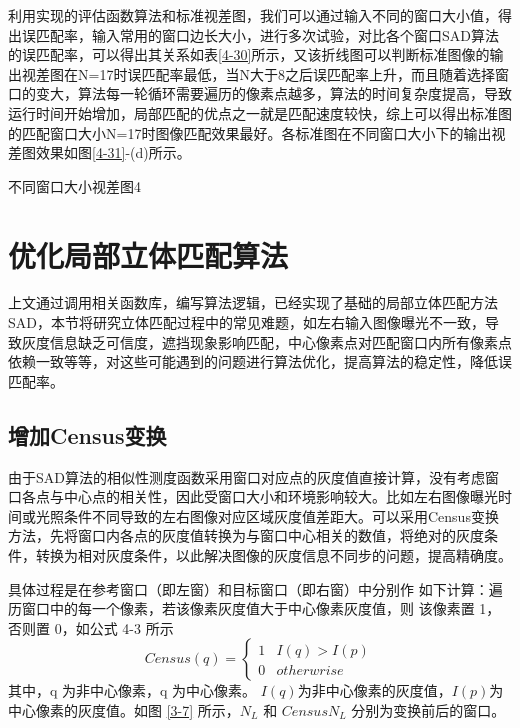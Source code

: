 利用实现的评估函数算法和标准视差图，我们可以通过输入不同的窗口大小值，得出误匹配率，输入常用的窗口边长大小，进行多次试验，对比各个窗口SAD算法的误匹配率，可以得出其关系如表\ref{4-30}所示，又该折线图可以判断标准图像的输出视差图在N=17时误匹配率最低，当N大于8之后误匹配率上升，而且随着选择窗口的变大，算法每一轮循环需要遍历的像素点越多，算法的时间复杂度提高，导致运行时间开始增加，局部匹配的优点之一就是匹配速度较快，综上可以得出标准图的匹配窗口大小N=17时图像匹配效果最好。各标准图在不同窗口大小下的输出视差图效果如图\ref{4-31}-(d)所示。

\begin{pics}[h]{不同窗口大小视差图}{4}
\end{pics}

\section{优化局部立体匹配算法}

上文通过调用相关函数库，编写算法逻辑，已经实现了基础的局部立体匹配方法SAD，本节将研究立体匹配过程中的常见难题，如左右输入图像曝光不一致，导致灰度信息缺乏可信度，遮挡现象影响匹配，中心像素点对匹配窗口内所有像素点依赖一致等等，对这些可能遇到的问题进行算法优化，提高算法的稳定性，降低误匹配率。

\subsection{增加Census变换}


由于SAD算法的相似性测度函数采用窗口对应点的灰度值直接计算，没有考虑窗口各点与中心点的相关性，因此受窗口大小和环境影响较大。比如左右图像曝光时间或光照条件不同导致的左右图像对应区域灰度值差距大。可以采用Census变换方法，先将窗口内各点的灰度值转换为与窗口中心相关的数值，将绝对的灰度条件，转换为相对灰度条件，以此解决图像的灰度信息不同步的问题，提高精确度。

具体过程是在参考窗口（即左窗）和目标窗口（即右窗）中分别作
如下计算：遍历窗口中的每一个像素，若该像素灰度值大于中心像素灰度值，则
该像素置 1，否则置 0，如公式 4-3 所示
\begin{equation}
Census(q)=\left\{\begin{matrix}
1 & I(q)>I(p) \\ 
0 & otherwrise 
\end{matrix}\right.
\end{equation}
其中，q 为非中心像素，q 为中心像素。 $I(q)$为非中心像素的灰度值，$ I(p)$为
中心像素的灰度值。如图 \ref{3-7} 所示，$N_{L}$ 和 $CensusN_{L}$ 分别为变换前后的窗口。

